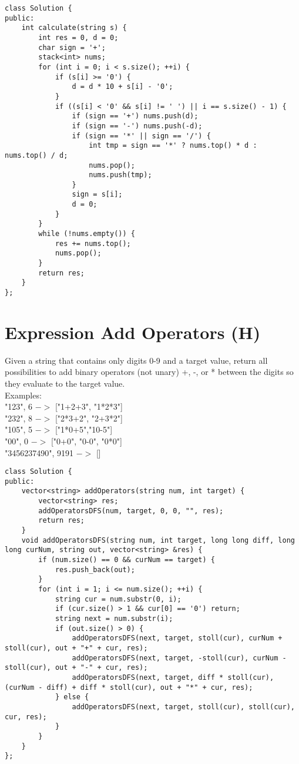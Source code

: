 \begin{lstlisting}
class Solution {
public:
    int calculate(string s) {
        int res = 0, d = 0;
        char sign = '+';
        stack<int> nums;
        for (int i = 0; i < s.size(); ++i) {
            if (s[i] >= '0') {
                d = d * 10 + s[i] - '0';
            }
            if ((s[i] < '0' && s[i] != ' ') || i == s.size() - 1) {
                if (sign == '+') nums.push(d);
                if (sign == '-') nums.push(-d);
                if (sign == '*' || sign == '/') {
                    int tmp = sign == '*' ? nums.top() * d : nums.top() / d;
                    nums.pop();
                    nums.push(tmp);
                }
                sign = s[i];
                d = 0;
            } 
        }
        while (!nums.empty()) {
            res += nums.top();
            nums.pop();
        }
        return res;
    }
};
\end{lstlisting}


\section{Expression Add Operators (H)}
Given a string that contains only digits 0-9 and a target value, return all possibilities to add binary operators (not unary) +, -, or * between the digits so they evaluate to the target value.\\

Examples:\\
"123", 6 $->$ ["1+2+3", "1*2*3"] \\
"232", 8 $->$ ["2*3+2", "2+3*2"]\\
"105", 5 $->$ ["1*0+5","10-5"]\\
"00", 0 $->$ ["0+0", "0-0", "0*0"]\\
"3456237490", 9191 $->$ []\\

\begin{lstlisting}
class Solution {
public:
    vector<string> addOperators(string num, int target) {
        vector<string> res;
        addOperatorsDFS(num, target, 0, 0, "", res);
        return res;
    }
    void addOperatorsDFS(string num, int target, long long diff, long long curNum, string out, vector<string> &res) {
        if (num.size() == 0 && curNum == target) {
            res.push_back(out);
        }
        for (int i = 1; i <= num.size(); ++i) {
            string cur = num.substr(0, i);
            if (cur.size() > 1 && cur[0] == '0') return;
            string next = num.substr(i);
            if (out.size() > 0) {
                addOperatorsDFS(next, target, stoll(cur), curNum + stoll(cur), out + "+" + cur, res);
                addOperatorsDFS(next, target, -stoll(cur), curNum - stoll(cur), out + "-" + cur, res);
                addOperatorsDFS(next, target, diff * stoll(cur), (curNum - diff) + diff * stoll(cur), out + "*" + cur, res);
            } else {
                addOperatorsDFS(next, target, stoll(cur), stoll(cur), cur, res);
            }
        }
    }
};
\end{lstlisting}


